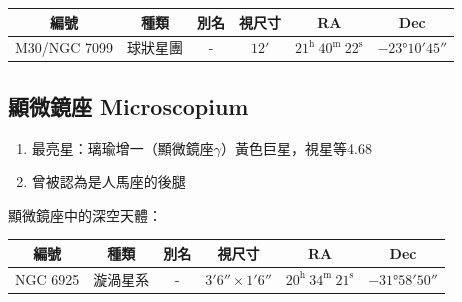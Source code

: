 \begin{center}
\begin{longtable}{c | c | c | c | c | c}
    編號 & 種類 & 別名 & 視尺寸 & RA & Dec \\
    \hline
    \endfirsthead


    \endfoot

    \endlastfoot

    M30/NGC 7099 & 球狀星團 & - & \(\ang{;12;}\) & \(21^\text{h }40^\text{m }22^\text{s}\) & \(-\ang{23;10;45}\) \\ %
\end{longtable}
\end{center}


\subsection{顯微鏡座 Microscopium}
\begin{enumerate}
    \item 最亮星：璃瑜增一（顯微鏡座\(\gamma\)）黃色巨星，視星等4.68
    \item 曾被認為是人馬座的後腿
\end{enumerate}
顯微鏡座中的深空天體：
\newline

\begin{center}
\begin{longtable}{c | c | c | c | c | c}
    編號 & 種類 & 別名 & 視尺寸 & RA & Dec \\
    \hline
    \endfirsthead


    \endfoot

    \endlastfoot

    NGC 6925 & 漩渦星系 & - & \(\ang{;3;6}\times\ang{;1;6}\) & \(20^\text{h }34^\text{m }21^\text{s}\) & \(-\ang{31;58;50}\) \\ %
\end{longtable}
\end{center}

